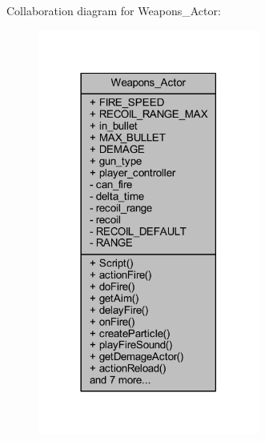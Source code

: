 Collaboration diagram for Weapons\+\_\+\+Actor\+:\nopagebreak
\begin{figure}[H]
\begin{center}
\leavevmode
\includegraphics[width=206pt]{class_weapons___actor__coll__graph}
\end{center}
\end{figure}
